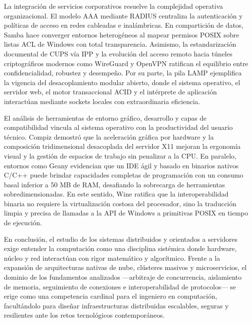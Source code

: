 \documentclass[12pt]{article}
\begin{document}
La integración de servicios corporativos resuelve la complejidad operativa organizacional. El modelo AAA mediante RADIUS centraliza la autenticación y políticas de acceso en redes cableadas e inalámbricas. En compartición de datos, Samba hace converger entornos heterogéneos al mapear permisos POSIX sobre listas ACL de Windows con total transparencia. Asimismo, la estandarización documental de CUPS vía IPP y la evolución del acceso remoto hacia túneles criptográficos modernos como WireGuard y OpenVPN ratifican el equilibrio entre confidencialidad, robustez y desempeño. Por su parte, la pila LAMP ejemplifica la vigencia del desacoplamiento modular abierto, donde el sistema operativo, el servidor web, el motor transaccional ACID y el intérprete de aplicación interactúan mediante sockets locales con extraordinaria eficiencia.

El análisis de herramientas de entorno gráfico, desarrollo y capas de compatibilidad vincula al sistema operativo con la productividad del usuario técnico. Compiz demostró que la aceleración gráfica por hardware y la composición tridimensional desacoplada del servidor X11 mejoran la ergonomía visual y la gestión de espacios de trabajo sin penalizar a la CPU. En paralelo, entornos como Geany evidencian que un IDE ágil y basado en binarios nativos C/C++ puede brindar capacidades completas de programación con un consumo basal inferior a 50 MB de RAM, desafiando la sobrecarga de herramientas sobredimensionadas. En este sentido, Wine ratifica que la interoperabilidad binaria no requiere la virtualización costosa del procesador, sino la traducción limpia y precisa de llamadas a la API de Windows a primitivas POSIX en tiempo de ejecución.

En conclusión, el estudio de los sistemas distribuidos y orientados a servidores exige entender la computación como una disciplina sistémica donde hardware, núcleo y red interactúan con rigor matemático y algorítmico. Frente a la expansión de arquitecturas nativas de nube, clústeres masivos y microservicios, el dominio de los fundamentos analizados ---arbitraje de concurrencia, aislamiento de memoria, seguimiento de conexiones e interoperabilidad de protocolos--- se erige como una competencia cardinal para el ingeniero en computación, facultándolo para diseñar infraestructuras distribuidas escalables, seguras y resilientes ante los retos tecnológicos contemporáneos.

\nocite{*}
\printbibliography[heading=bibintoc, title={Referencias}]
\end{document}
